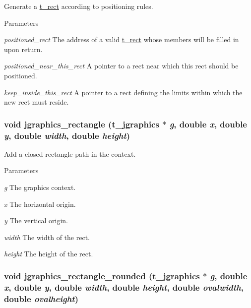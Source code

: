 Generate a \hyperlink{structt__rect}{t\_\-rect} according to positioning rules. 
\begin{DoxyParams}{Parameters}
\item[{\em positioned\_\-rect}]The address of a valid \hyperlink{structt__rect}{t\_\-rect} whose members will be filled in upon return. \item[{\em positioned\_\-near\_\-this\_\-rect}]A pointer to a rect near which this rect should be positioned. \item[{\em keep\_\-inside\_\-this\_\-rect}]A pointer to a rect defining the limits within which the new rect must reside. \end{DoxyParams}
\hypertarget{group__jgraphics_ga01f63358f24616678d69721d7d505e74}{
\subsubsection[{jgraphics\_\-rectangle}]{\setlength{\rightskip}{0pt plus 5cm}void jgraphics\_\-rectangle ({\bf t\_\-jgraphics} $\ast$ {\em g}, \/  double {\em x}, \/  double {\em y}, \/  double {\em width}, \/  double {\em height})}}
\label{group__jgraphics_ga01f63358f24616678d69721d7d505e74}


Add a closed rectangle path in the context. 
\begin{DoxyParams}{Parameters}
\item[{\em g}]The graphics context. \item[{\em x}]The horizontal origin. \item[{\em y}]The vertical origin. \item[{\em width}]The width of the rect. \item[{\em height}]The height of the rect. \end{DoxyParams}
\hypertarget{group__jgraphics_ga0e15af397f5f4eb1e474e31ea43e1d7c}{
\subsubsection[{jgraphics\_\-rectangle\_\-rounded}]{\setlength{\rightskip}{0pt plus 5cm}void jgraphics\_\-rectangle\_\-rounded ({\bf t\_\-jgraphics} $\ast$ {\em g}, \/  double {\em x}, \/  double {\em y}, \/  double {\em width}, \/  double {\em height}, \/  double {\em ovalwidth}, \/  double {\em ovalheight})}}
\label{group__jgraphics_ga0e15af397f5f4eb1e474e31ea43e1d7c}


